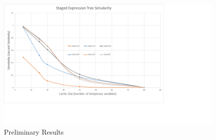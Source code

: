\documentclass[10pt, conference]{IEEEtran} %
\begin{document}
\begin{figure}[tbh]
	\centering
	\includegraphics[width=2.0\columnwidth]{Staging_Results.png}
	\caption{\small Preliminary Results	}
	\vspace{-0.1in}
\end{figure}


\end{document}
